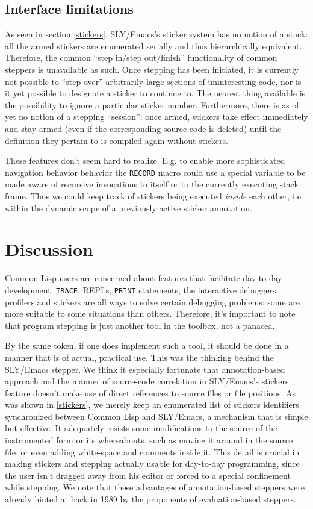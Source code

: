 \documentclass[sigconf]{acmart}
\begin{document}
\subsection{Interface limitations}

As seen in section \ref{stickers}, SLY/Emacs's sticker system has no
notion of a stack: all the armed stickers are enumerated serially and
thus hierarchically equivalent.  Therefore, the common ``step in/step
out/finish'' functionality of common steppers is unavailable as such.
Once stepping has been initiated, it is currently not possible to
``step over'' arbitrarily large sections of uninteresting code, nor is
it yet possible to designate a sticker to continue to.  The nearest
thing available is the possibility to ignore a particular sticker
number.  Furthermore, there is as of yet no notion of a stepping
``session'': once armed, stickers take effect immediately and stay
armed (even if the corresponding source code is deleted) until the
definition they pertain to is compiled again without stickers.

These features don't seem hard to realize.  E.g. to enable more
sophisticated navigation behavior behavior the \texttt{RECORD} macro
could use a special variable to be made aware of recursive invocations
to itself or to the currently executing stack frame.  Thus we could
keep track of stickers being executed \emph{inside} each other,
i.e. within the dynamic scope of a previously active sticker
annotation.

\section{Discussion}

Common Lisp users are concerned about features that facilitate
day-to-day development.  \texttt{TRACE}, REPLs, \texttt{PRINT}
statements, the interactive debuggers, profilers and stickers are all
ways to solve certain debugging problems: some are more suitable to
some situations than others.  Therefore, it's important to note that
program stepping is just another tool in the toolbox, not a
panacea.

By the same token, if one does implement such a tool, it should be
done in a manner that is of actual, practical use.  This was the
thinking behind the SLY/Emacs stepper.  We think it especially
fortunate that annotation-based approach and the manner of source-code
correlation in SLY/Emacs's stickers feature doesn't make use of direct
references to source files or file positions.  As was shown in
\ref{stickers}, we merely keep an enumerated list of stickers
identifiers synchronized between Common Lisp and SLY/Emacs, a
mechanism that is simple but effective.  It adequately resists some
modifications to the source of the instrumented form or its
whereabouts, such as moving it around in the source file, or even
adding white-space and comments inside it.  This detail is crucial in
making stickers and stepping actually usable for day-to-day
programming, since the user isn't dragged away from his editor or
forced to a special confinement while stepping.  We note that these
advantages of annotation-based steppers were already hinted at back in
1989 by the proponents of evaluation-based steppers\cite[l.41,
l.42]{evaluation-based}.
\end{document}
